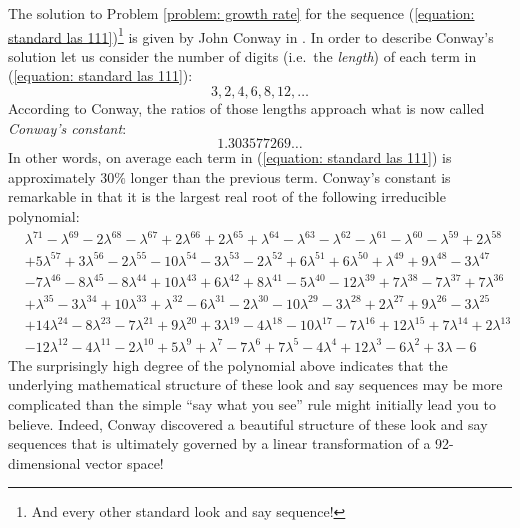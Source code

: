 \documentclass[reqno]{amsart}
\theoremstyle{definition}
\begin{document}
The solution to Problem \ref{problem: growth rate} for the sequence (\ref{equation: standard las 111})\footnote{And every other standard look and say sequence!}
 is given by John Conway in \cite{Conway}. In order to describe Conway's solution let us consider the number of digits (i.e.~the \emph{length}) of each term in (\ref{equation: standard las 111}):
\begin{equation*}
    3, 2, 4, 6, 8, 12,\ldots
\end{equation*}
According to Conway, the ratios of those lengths approach what is now called \emph{Conway's constant}:
\begin{equation*}\label{Conway constant}
    1.303577269\ldots%
\end{equation*}
In other words, on average each term in (\ref{equation: standard las 111}) is approximately $30\%$ longer than the previous term. Conway's constant is remarkable in that it is the largest real root of the following irreducible polynomial:
\begin{align*}
    & \lambda^{71} - \lambda^{69} - 2 \lambda^{68} - \lambda^{67} + 2 \lambda^{66} + 2 \lambda^{65} + \lambda^{64} - \lambda^{63} - \lambda^{62} - \lambda^{61} - \lambda^{60} - \lambda^{59} + 2 \lambda^{58} 
    \\ &
    + 5 \lambda^{57} + 3 \lambda^{56} - 2 \lambda^{55} - 10 \lambda^{54} - 3 \lambda^{53} - 2 \lambda^{52} + 6 \lambda^{51} + 6 \lambda^{50} + \lambda^{49} + 9 \lambda^{48} - 3 \lambda^{47} 
    \\ &
    - 7 \lambda^{46} - 8 \lambda^{45} - 8 \lambda^{44} + 10 \lambda^{43} + 6 \lambda^{42} + 8 \lambda^{41} - 5 \lambda^{40} - 12 \lambda^{39} + 7 \lambda^{38} - 7 \lambda^{37} + 7 \lambda^{36} 
    \\ &
    + \lambda^{35} - 3 \lambda^{34} + 10 \lambda^{33} + \lambda^{32} - 6 \lambda^{31} - 2 \lambda^{30} - 10 \lambda^{29} - 3 \lambda^{28} + 2 \lambda^{27} + 9 \lambda^{26} - 3 \lambda^{25} 
    \\ &
    + 14 \lambda^{24} - 8 \lambda^{23} - 7 \lambda^{21} + 9 \lambda^{20} + 3 \lambda^{19} - 4 \lambda^{18} - 10 \lambda^{17} - 7 \lambda^{16} + 12 \lambda^{15} + 7 \lambda^{14} + 2 \lambda^{13} 
    \\ &
    - 12 \lambda^{12} - 4 \lambda^{11} - 2 \lambda^{10} + 5 \lambda^{9} + \lambda^{7} - 7 \lambda^{6} + 7 \lambda^{5} - 4 \lambda^{4} + 12 \lambda^{3} - 6 \lambda^{2} + 3 \lambda - 6
\end{align*}
The surprisingly high degree of the polynomial above indicates that the underlying mathematical structure of these look and say sequences may be more complicated than the simple ``say what you see'' rule might initially lead you to believe. Indeed, Conway discovered a beautiful structure of these look and say sequences that is ultimately governed by a linear transformation of a 92-dimensional vector space! 
\end{document}
